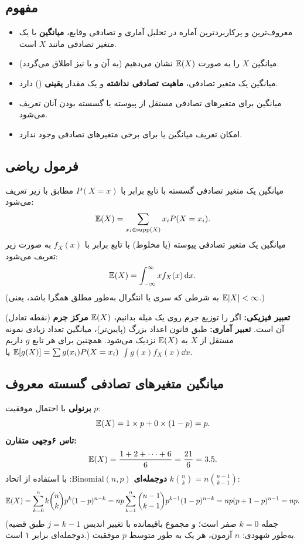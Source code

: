 \subsection{مفهوم}
\begin{itemize}
\item معروف‌ترین و پرکاربردترین آماره در تحلیل آماری و تصادفی وقایع، \textbf{میانگین} یا  یک متغیر تصادفی مانند $X$ است.
\item میانگین $X$ را به صورت $\mathbb{E}(X)$ نشان می‌دهیم (به آن  و یا  نیز اطلاق می‌گردد).
\item میانگین یک متغیر تصادفی، \textcolor{red!70!black}{\textbf{ماهیت تصادفی نداشته}} و یک مقدار \textcolor{blue!60!black}{\textbf{یقینی}} () دارد.
\item میانگین برای متغیرهای تصادفی مستقل از پیوسته یا گسسته بودن آنان تعریف می‌شود.
\item امکان تعریف میانگین یا  برای برخی متغیرهای تصادفی وجود ندارد.
\end{itemize}

\subsection{فرمول ریاضی}
\begin{definition}[میانگین]
میانگین یک متغیر تصادفی گسسته با تابع  برابر با $P(X=x)$ مطابق با زیر تعریف می‌شود:
\[
\mathbb{E}(X)=\sum_{x_i\in\mathrm{supp}(X)}x_iP(X=x_i).
\]
میانگین یک متغیر تصادفی پیوسته (یا مخلوط) با تابع  برابر با $f_X(x)$ به صورت زیر تعریف می‌شود:
\[
\mathbb{E}(X)=\int_{-\infty}^{\infty}xf_X(x)\,\mathrm{d} x .
\]
(به شرطی که سری یا انتگرال به‌طور مطلق همگرا باشد، یعنی $\mathbb{E}|X|<\infty$.)
\end{definition}

\begin{note}
\notetitle \textbf{تعبیر فیزیکی:} اگر  را توزیع جرم روی یک میله بدانیم، $\mathbb{E}(X)$ \textbf{مرکز جرم} (نقطه تعادل) آن است. \textbf{تعبیر آماری:} طبق قانون اعداد بزرگ (پایین‌تر)، میانگین تعداد زیادی نمونه مستقل از $X$ به $\mathbb{E}(X)$ نزدیک می‌شود. همچنین برای هر تابع $g$ داریم $\mathbb{E}[g(X)]=\sum g(x_i)P(X=x_i)$ یا $\int g(x)f_X(x)\dd x$.
\end{note}

\subsection{میانگین متغیرهای تصادفی گسسته معروف}

\begin{example}
\textbf{برنولی} با احتمال موفقیت $p$:
\[
\mathbb{E}(X)=1\times p+0\times(1-p)=p .
\]
\textbf{تاس ۶وجهی متقارن:}
\[
\mathbb{E}(X)=\frac{1+2+\cdots+6}{6}=\frac{21}{6}=3.5 .
\]
\textbf{دوجمله‌ای} $\mathrm{Binomial}(n,p)$: با استفاده از اتحاد $k\binom nk=n\binom{n-1}{k-1}$:
\[
\mathbb{E}(X)=\sum_{k=0}^{n}k\binom nkp^k(1-p)^{n-k}=np\sum_{k=1}^{n}\binom{n-1}{k-1}p^{k-1}(1-p)^{n-k}=np(p+1-p)^{n-1}=np .
\]
(جمله $k=0$ صفر است؛ و مجموع باقیمانده با تغییر اندیس $j=k-1$ طبق قضیه دوجمله‌ای برابر ۱ است.) به‌طور شهودی: $n$ آزمون، هر یک به طور متوسط $p$ موفقیت.
\end{example}

